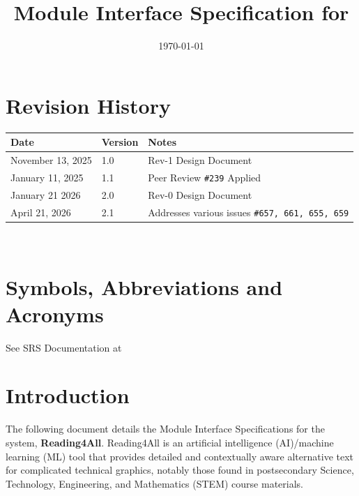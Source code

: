 \documentclass[12pt, titlepage]{article}
\begin{document}
\title{Module Interface Specification for \progname{}}

\author{\authname}

\date{\today}

\maketitle


\section{Revision History}

\begin{tabularx}{\textwidth}{p{4cm}p{2cm}X}
  \toprule {\bf Date} & {\bf Version} & {\bf Notes}\\
  \midrule
  November 13, 2025 & 1.0 &  Rev-1 Design Document\\
  January 11, 2025 & 1.1 & Peer Review \texttt{\#239} Applied\\
  January 21 2026 & 2.0 & Rev-0 Design Document\\
  April 21, 2026 & 2.1 & Addresses various issues \texttt{\#657, 661, 655, 659}\\
  \bottomrule
\end{tabularx}

~\newpage

\section{Symbols, Abbreviations and Acronyms}

See SRS Documentation at \citet{SRS}

\newpage

\tableofcontents

\newpage


\section{Introduction}

The following document details the Module Interface Specifications for the
\progname{} system, \textbf{Reading4All}. Reading4All is an
artificial intelligence (AI)/machine learning (ML) tool that
provides detailed and contextually aware alternative text for
complicated technical graphics, notably those found in postsecondary
Science, Technology, Engineering, and Mathematics (STEM) course materials.
\end{document}
